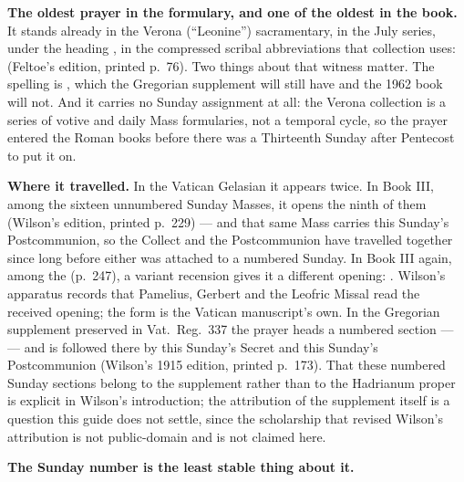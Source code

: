 \textbf{The oldest prayer in the formulary, and one of the oldest in the
book.} It stands already in the Verona (``Leonine'') sacramentary, in the July
series, under the heading , in the compressed scribal
abbreviations that collection uses:  (Feltoe's edition, printed p.~76). Two things about that
witness matter. The spelling is , which the Gregorian
supplement will still have and the 1962 book will not. And it carries no
Sunday assignment at all: the Verona collection is a series of votive and
daily Mass formularies, not a temporal cycle, so the prayer entered the Roman
books before there was a Thirteenth Sunday after Pentecost to put it on.

\textbf{Where it travelled.} In the Vatican Gelasian it appears twice. In Book
III, among the sixteen unnumbered Sunday Masses, it opens the ninth of them
(Wilson's edition, printed p.~229) --- and that same Mass carries this
Sunday's Postcommunion, so the Collect and the Postcommunion have travelled
together since long before either was attached to a numbered Sunday. In Book
III again, among the  (p.~247), a variant
recension gives it a different opening: . Wilson's apparatus records that Pamelius, Gerbert and the Leofric
Missal read the received opening; the  form is the Vatican
manuscript's own. In the Gregorian supplement preserved in Vat.\ Reg.\ 337 the
prayer heads a numbered section ---  --- and is followed there by this Sunday's Secret and this
Sunday's Postcommunion (Wilson's 1915 edition, printed p.~173). That these
numbered Sunday sections belong to the supplement rather than to the
Hadrianum proper is explicit in Wilson's introduction; the attribution of the
supplement itself is a question this guide does not settle, since the
scholarship that revised Wilson's attribution is not public-domain and is not
claimed here.

\textbf{The Sunday number is the least stable thing about it.}

